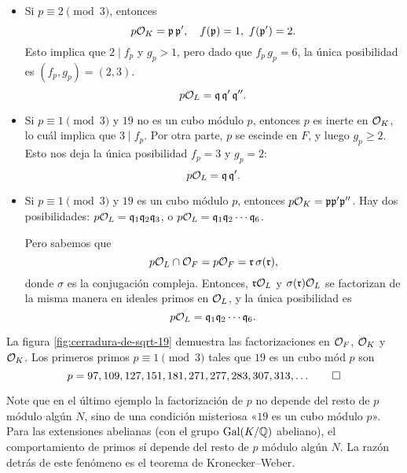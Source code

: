 \begin{ejemplo}
  \begin{itemize}
  \item Si $p \equiv 2 \pmod{3}$, entonces
    \[ p\mathcal{O}_K = \mathfrak{p}\,\mathfrak{p}', \quad
       f (\mathfrak{p}) = 1, ~ f (\mathfrak{p}') = 2. \]
    Esto implica que $2 \mid f_p$ y $g_p > 1$, pero dado que $f_p\,g_p = 6$,
    la única posibilidad es $(f_p,g_p) = (2,3)$.
    $$p\mathcal{O}_L = \mathfrak{q}\,\mathfrak{q}'\,\mathfrak{q}''.$$

  \item Si $p \equiv 1 \pmod{3}$ y $19$ no es un cubo módulo $p$, entonces
    $p$ es inerte en $\mathcal{O}_K$, lo cuál implica que $3 \mid f_p$. Por otra parte,
    $p$ se escinde en $F$, y luego $g_p \ge 2$. Esto nos deja la única
    posibilidad $f_p = 3$ y $g_p = 2$:
    $$p\mathcal{O}_L = \mathfrak{q}\,\mathfrak{q}'.$$

  \item Si $p \equiv 1\pmod{3}$ y $19$ es un cubo módulo $p$, entonces
    $p\mathcal{O}_K = \mathfrak{p} \mathfrak{p}' \mathfrak{p}''$.
    Hay dos posibilidades:
    $p\mathcal{O}_L = \mathfrak{q}_1 \mathfrak{q}_2 \mathfrak{q}_3$,
    o
    $p\mathcal{O}_L = \mathfrak{q}_1 \mathfrak{q}_2 \cdots \mathfrak{q}_6$.

    Pero sabemos que
    $$p\mathcal{O}_L \cap \mathcal{O}_F = p\mathcal{O}_F = \mathfrak{r}\,\sigma (\mathfrak{r}),$$
    donde $\sigma$ es la conjugación compleja. Entonces, $\mathfrak{r}\mathcal{O}_L$
    y $\sigma (\mathfrak{r})\mathcal{O}_L$ se factorizan de la misma manera en
    ideales primos en $\mathcal{O}_L$, y la única posibilidad es
    $$p\mathcal{O}_L = \mathfrak{q}_1 \mathfrak{q}_2 \cdots \mathfrak{q}_6.$$
  \end{itemize}

  La figura \ref{fig:cerradura-de-sqrt-19} demuestra las factorizaciones en
  $\mathcal{O}_F$, $\mathcal{O}_K$ y $\mathcal{O}_K$. Los primeros primos $p \equiv 1 \pmod{3}$ tales que
  $19$ es un cubo mód $p$ son
  \[ p = 97, 109, 127, 151, 181, 271, 277, 283, 307, 313, \ldots \qedhere \]
\end{ejemplo}

Note que en el último ejemplo la factorización de $p$ no depende del resto de
$p$ módulo algún $N$, sino de una condición misteriosa
«$19$ es un cubo módulo $p$». Para las extensiones abelianas (con el grupo
$\operatorname{Gal} (K/\mathbb{Q})$ abeliano), el comportamiento de primos sí depende del resto de
$p$ módulo algún $N$. La razón detrás de este fenómeno es el teorema de
Kronecker--Weber.

